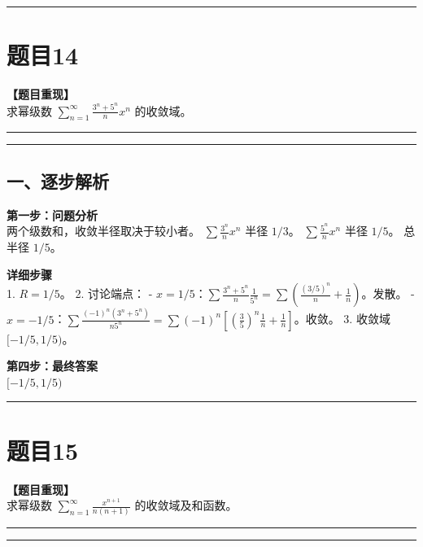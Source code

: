 \documentclass[12pt, a4paper]{ctexart}
\newcommand{\TopSeparator}{
    \par\noindent\rule{\textwidth}{1.5pt}\vspace{0.5em} %
}
\newcommand{\AnalysisSeparator}{
    \par\noindent\rule{\textwidth}{0.5pt}\vspace{0.2em}\hrule\vspace{0.5em} %
}
\newenvironment{RedAnalysis}{
    \par
    \color{red} %
}{
    \par
    \color{black} %
}
\begin{document}
\vspace{2em}

\TopSeparator
\section*{题目14}

\textbf{【题目重现】} \\
求幂级数 $ \sum_{n=1}^{\infty} \frac{3^{n} + 5^{n}}{n} x^{n} $ 的收敛域。

\AnalysisSeparator

\begin{RedAnalysis}

\subsection*{一、逐步解析}

\textbf{第一步：问题分析} \\
两个级数和，收敛半径取决于较小者。
$\sum \frac{3^n}{n} x^n$ 半径 $1/3$。
$\sum \frac{5^n}{n} x^n$ 半径 $1/5$。
总半径 $1/5$。

\textbf{详细步骤} \\
1. $R = 1/5$。
2. 讨论端点：
   - $x = 1/5$：$\sum \frac{3^n+5^n}{n} \frac{1}{5^n} = \sum (\frac{(3/5)^n}{n} + \frac{1}{n})$。发散。
   - $x = -1/5$：$\sum \frac{(-1)^n (3^n+5^n)}{n 5^n} = \sum (-1)^n [(\frac{3}{5})^n \frac{1}{n} + \frac{1}{n}]$。收敛。
3. 收敛域 $[-1/5, 1/5)$。

\textbf{第四步：最终答案} \\
$ [-1/5, 1/5) $

\end{RedAnalysis}

\vspace{2em}

\TopSeparator
\section*{题目15}

\textbf{【题目重现】} \\
求幂级数 $ \sum_{n=1}^{\infty} \frac{x^{n+1}}{n(n+1)} $ 的收敛域及和函数。

\AnalysisSeparator
\end{document}
